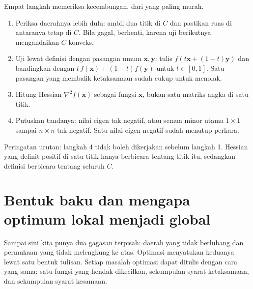 \begin{resep}
Empat langkah memeriksa kecembungan, dari yang paling murah.
\begin{enumerate}
  \item Periksa daerahnya lebih dulu: ambil dua titik di $C$ dan pastikan ruas di
        antaranya tetap di $C$. Bila gagal, berhenti, karena uji berikutnya mengandaikan
        $C$ konveks.
  \item Uji lewat definisi dengan pasangan umum $\mathbf{x},\mathbf{y}$: tulis
        $f(t\mathbf{x}+(1-t)\mathbf{y})$ dan bandingkan dengan
        $t\,f(\mathbf{x})+(1-t)f(\mathbf{y})$ untuk $t\in[0,1]$. Satu pasangan yang
        membalik ketaksamaan sudah cukup untuk menolak.
  \item Hitung Hessian $\nabla^{2}f(\mathbf{x})$ sebagai fungsi $\mathbf{x}$, bukan satu
        matriks angka di satu titik.
  \item Putuskan tandanya: nilai eigen tak negatif, atau semua minor utama
        $1\times1$ sampai $n\times n$ tak negatif. Satu nilai eigen negatif sudah
        menutup perkara.
\end{enumerate}
Peringatan urutan: langkah 4 tidak boleh dikerjakan sebelum langkah 1. Hessian yang
definit positif di satu titik hanya berbicara tentang titik itu, sedangkan definisi
berbicara tentang seluruh $C$.
\end{resep}

\section{Bentuk baku dan mengapa optimum lokal menjadi global}

Sampai sini kita punya dua gagasan terpisah: daerah yang tidak berlubang dan permukaan
yang tidak melengkung ke atas. Optimasi menyatukan keduanya lewat satu bentuk tulisan.
Setiap masalah optimasi dapat ditulis dengan cara yang sama: satu fungsi yang hendak
dikecilkan, sekumpulan syarat ketaksamaan, dan sekumpulan syarat kesamaan.


